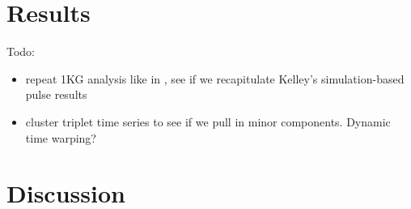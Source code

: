 \documentclass[11pt]{article}
\begin{document}
\section*{Results}\label{sec:results}

Todo:
\begin{itemize}
\item repeat 1KG analysis like in \cite{Harris2017-fw}, see if we recapitulate Kelley's simulation-based pulse results
\item cluster triplet time series to see if we pull in minor components. Dynamic time warping?
\end{itemize}


\section*{Discussion}\label{sec:discussion}



\end{document}
